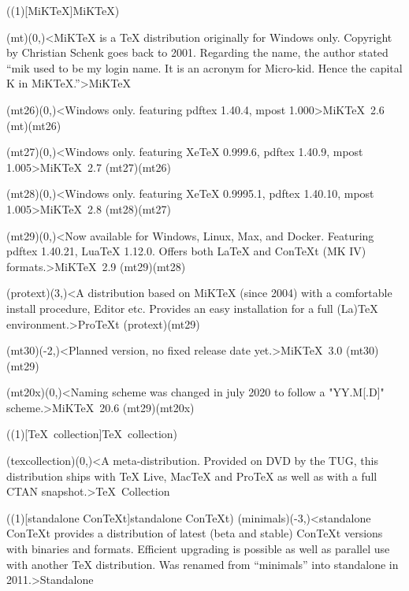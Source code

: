 \tograph(\tostruct(1)[MiK\TeX]{MiK\TeX}){
	\tonode(mt)(0,\layer)<MiKTeX is a TeX distribution originally for Windows only. Copyright by Christian Schenk goes back to 2001. Regarding the name, the author stated “mik used to be my login name. It is an acronym for Micro-kid. Hence the capital K in MiKTeX.”>{MiK\TeX}
	\steplayer

	\tonode(mt26)(0,\layer)<Windows only. featuring  pdftex 1.40.4, mpost 1.000>{MiK\TeX\ 2.6}
	\todraw(mt)(mt26)
	\steplayer

	\tonode(mt27)(0,\layer)<Windows only. featuring  XeTeX 0.999.6, pdftex 1.40.9, mpost 1.005>{MiK\TeX\ 2.7}
	\todraw(mt27)(mt26)
	\steplayer

	\tonode(mt28)(0,\layer)<Windows only. featuring  XeTeX 0.9995.1, pdftex 1.40.10, mpost 1.005>{MiK\TeX\ 2.8}
	\todraw(mt28)(mt27)
	\steplayer

	\tonode(mt29)(0,\layer)<Now available for Windows, Linux, Max, and Docker. Featuring pdftex 1.40.21, LuaTeX 1.12.0. Offers both LaTeX and ConTeXt (MK IV) formats.>{MiK\TeX\ 2.9}
	\todraw(mt29)(mt28)
	\steplayer
	
	\tonode(protext)(3,\layer)<A distribution based on MiKTeX (since 2004) with a comfortable install procedure, Editor etc. Provides an easy installation for a full (La)TeX environment.>{ProTeXt}
	\todraw(protext)(mt29)

\steplayer[-0.5]

	\tonode[\experimental](mt30)(-2,\layer)<Planned version, no fixed release date yet.>{MiK\TeX\ 3.0}
	\todraw(mt30)(mt29)
	
\steplayer
	\tonode(mt20x)(0,\layer)<Naming scheme was changed in july 2020 to follow a "YY.M[.D]" scheme.>{MiK\TeX\ 20.6}
	\todraw(mt29)(mt20x)

}

\tograph(\tostruct(1)[\TeX\ collection]{\TeX\ collection}){
	\tonode(texcollection)(0,\layer)<A meta-distribution. Provided on DVD by the TUG, this distribution ships with TeX Live, MacTeX and ProTeX as well as with a full CTAN snapshot.>{\TeX\ Collection}

}

\tograph(\tostruct(1)[standalone Con\TeX t]{standalone Con\TeX t}){
	\tonode(minimals)(-3,\layer)<standalone ConTeXt provides a distribution of latest (beta and stable) ConTeXt versions with binaries and formats. Efficient upgrading is possible as well as parallel use with another TeX distribution. Was renamed from “minimals” into standalone in 2011.>{Standalone}
}

